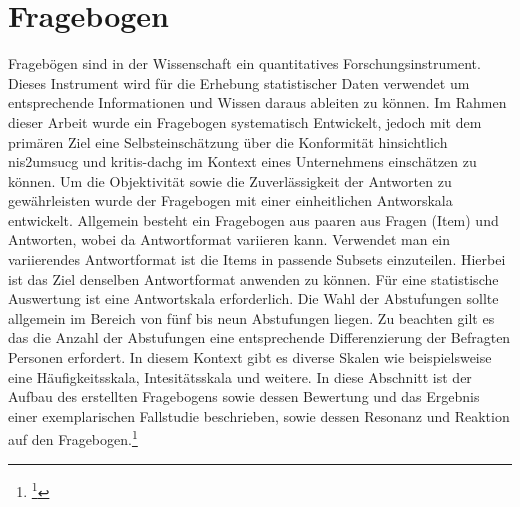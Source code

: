\documentclass[11pt,a4paper,hidelinks]{article}   %
\begin{document}
    \section{Fragebogen}\label{sec:HerleitungDesFragenkatalog}
        Fragebögen sind in der Wissenschaft ein quantitatives Forschungsinstrument. Dieses Instrument wird für die Erhebung statistischer Daten verwendet um entsprechende Informationen und Wissen daraus ableiten zu können. Im Rahmen dieser Arbeit wurde ein Fragebogen systematisch Entwickelt, jedoch mit dem primären Ziel eine Selbsteinschätzung über die Konformität hinsichtlich \gls{nis2umsucg} und \gls{kritis-dachg} im Kontext eines Unternehmens einschätzen zu können. Um die Objektivität sowie die Zuverlässigkeit der Antworten zu gewährleisten wurde der Fragebogen mit einer einheitlichen Antworskala entwickelt. Allgemein besteht ein Fragebogen aus paaren aus Fragen (Item) und Antworten, wobei da Antwortformat variieren kann. Verwendet man ein variierendes Antwortformat ist die Items in passende Subsets einzuteilen. Hierbei ist das Ziel denselben Antwortformat anwenden zu können. Für eine statistische Auswertung ist eine Antwortskala erforderlich. Die Wahl der Abstufungen sollte allgemein im Bereich von fünf bis neun Abstufungen liegen. Zu beachten gilt es das die Anzahl der Abstufungen eine entsprechende Differenzierung der Befragten Personen erfordert. In diesem Kontext gibt es diverse Skalen wie beispielsweise eine Häufigkeitsskala, Intesitätsskala und weitere. In diese Abschnitt ist der Aufbau des erstellten Fragebogens sowie dessen Bewertung und das Ergebnis einer exemplarischen Fallstudie beschrieben, sowie dessen Resonanz und Reaktion auf den Fragebogen.\footnote{
            \footcite[Vgl.][, S. 10 - 12, 14 - 16, 40 - 41, 43, 48 - 49, 50, 71 - 76, 79 - 86, 101 - 103, 107 - 112, 115 - 117, 124 - 125, 138 \& 154]{9783838544656} %
        }
\end{document}
